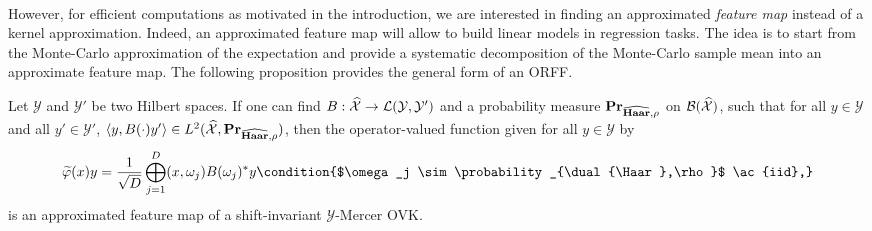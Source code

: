 \paragraph{}
However, for efficient computations as motivated in the introduction, we are
interested in finding an approximated \emph{feature map} instead of a kernel
approximation. Indeed, an approximated feature map will allow to build linear
models in regression tasks. The idea is to start from the Monte-Carlo
approximation of the expectation and provide a systematic decomposition of the
Monte-Carlo sample mean into an approximate feature map. The following
proposition provides the general form of an \acl{ORFF}.
\begin{proposition}[ORFF]
    \label{pr:ORFF-map} Let $\mathcal{Y}$ and $\mathcal{Y}'$ be two Hilbert
    spaces. If one can find $B: \widehat{\mathcal{X}} \to
    \mathcal{L}(\mathcal{Y},\mathcal{Y}')$ and a probability measure
    ${\mathbf{{Pr}}}_{\widehat{\mathbf{Haar}},\rho}$ on $\mathcal{B}(\widehat{\mathcal{X}})$,
    such that for all $y\in\mathcal{Y}$ and all $y'\in\mathcal{Y}'$, $\langle y,
    B(\cdot)y'\rangle \in L^2(\widehat{\mathcal{X}}, {\mathbf{{Pr}}}_{\widehat{\mathbf{Haar}},\rho})$,
    then the operator-valued function given for all $y\in\mathcal{Y}$ by
    \begin{dmath}
        \label{eq:phitilde}
        \tildePhi{\omega}(x)y
        = \frac{1}{\sqrt{D}}\Vect_{j=1}^D\pairing{x,
        \omega_j}B(\omega_j)^\adjoint y \condition{$\omega_j \sim
        \probability_{\dual{\Haar},\rho}$ \ac{iid},}
    \end{dmath}
    is an approximated feature map of a shift-invariant
    $\mathcal{Y}$-Mercer \acl{OVK}.
\end{proposition}
